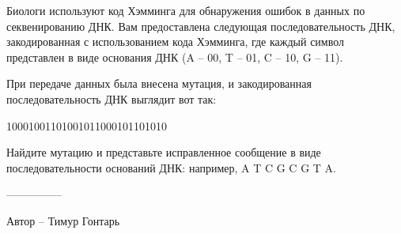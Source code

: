 \question
Биологи используют код Хэмминга для обнаружения ошибок в данных по секвенированию ДНК. Вам предоставлена следующая последовательность ДНК, закодированная с использованием кода Хэмминга, где каждый символ представлен в виде основания ДНК (A -- 00, T -- 01, C -- 10, G -- 11).

При передаче данных была внесена мутация, и закодированная последовательность ДНК выглядит вот так: 
\begin{center}
10001001101001011000101101010
\end{center}

Найдите мутацию и представьте исправленное сообщение в виде последовательности оснований ДНК: например, A T C G C G T A.

---------------

Автор -- Тимур Гонтарь